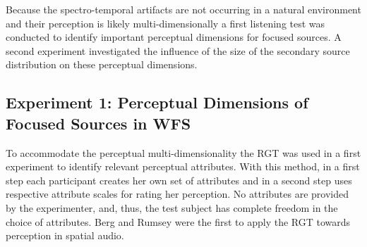 Because the spectro-temporal artifacts are not occurring in a natural environment
and their perception is likely multi-dimensionally a first listening test was
conducted to identify important perceptual dimensions for focused sources.
A second experiment investigated the influence of the size of the secondary source
distribution on these perceptual dimensions.

\subsection[Perceptual Dimensions of Focused Sources]{Experiment 1: Perceptual
Dimensions of Focused Sources in
\ac{WFS}\autocite[This experiment was done in collaboration with Matthias Geier
and parts of this section are published in][]{Geier2010a}}
\label{sec:experiment1_perceptual_dimensions_of_focused_sources_in_wfs}

To accommodate the perceptual multi-dimensionality the \ac{RGT} was used in a first
experiment to identify relevant perceptual attributes.\autocite{Kelly1955}
With this method, in a first step each participant creates her own set of
attributes and in a second step uses respective attribute scales for rating
her perception. No attributes are provided by the experimenter, and, thus,
the test subject has complete freedom in the choice of attributes.
Berg and Rumsey were the first to apply the \ac{RGT} towards perception in
spatial audio.


